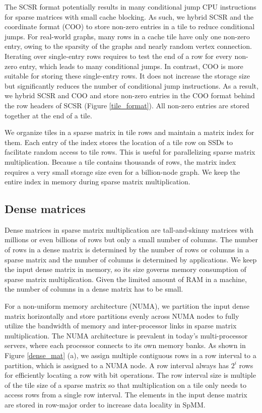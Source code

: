 The SCSR format potentially results in many conditional jump CPU instructions
for sparse matrices with small cache blocking. As such, we hybrid SCSR and
the coordinate format (COO) to store non-zero entries in a tile to reduce
conditional jumps.
For real-world graphs, many rows in a cache tile have only one non-zero entry,
owing to the sparsity of the graphs and nearly random vertex connection.
Iterating over single-entry rows requires to test the end of a row for every
non-zero entry, which leads to many conditional jumps.
In contrast, COO is more suitable for storing these
single-entry rows. It does not increase the storage size but significantly
reduces the number of conditional jump instructions. As a result, we hybrid
SCSR and COO and store non-zero entries in the COO format behind the row headers
of SCSR (Figure \ref{tile_format}). All non-zero entries are
stored together at the end of a tile.

We organize tiles in a sparse matrix in tile rows and maintain a matrix index
for them. Each entry of the index stores the location of a tile row on SSDs
to facilitate random access
to tile rows. This is useful for parallelizing sparse matrix multiplication.
Because a tile contains thousands of rows, the matrix index requires a very
small storage size even for a billion-node graph. We keep the entire index
in memory during sparse matrix multiplication.

\subsection{Dense matrices}
Dense matrices in sparse matrix multiplication are tall-and-skinny matrices
with millions or even billions of rows but only a small number of columns.
The number of rows in a dense matrix is determined by the number of rows or
columns in a sparse matrix and the number of columns is determined by applications.
We keep the input dense matrix in memory, so its size governs memory consumption
of sparse matrix multiplication. Given the limited amount of RAM in a machine,
the number of columns in a dense matrix has to be small.

For a non-uniform memory architecture (NUMA), we partition the input dense matrix
horizontally and store partitions evenly across NUMA nodes to fully utilize
the bandwidth of memory and inter-processor links in sparse matrix
multiplication. The NUMA architecture is prevalent in today's multi-processor
servers, where each processor connects to its own memory banks. As shown in
Figure \ref{dense_mat} (a), we assign multiple
contiguous rows in a row interval to a partition, which is assigned to a NUMA
node. A row interval always has $2^i$ rows for efficiently locating a row
with bit operations. The row interval size is multiple of the tile size of
a sparse matrix so that multiplication on a tile only needs to access rows
from a single row interval. The elements in the input dense matrix are stored
in row-major order to increase data locality in SpMM.

